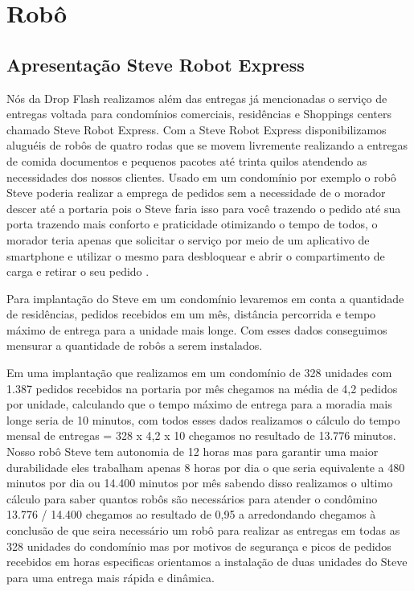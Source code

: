\chapter{Robô}
\label{ch:identificador}

\section{Apresentação Steve Robot Express}

Nós da Drop Flash realizamos além das entregas já mencionadas o serviço de entregas voltada para condomínios comerciais, residências e Shoppings centers chamado Steve Robot Express. Com a Steve Robot Express disponibilizamos aluguéis de robôs de quatro rodas que se movem livremente realizando a entregas    de comida documentos e pequenos pacotes até trinta quilos atendendo as necessidades dos nossos clientes. Usado em um condomínio por exemplo o robô Steve poderia realizar a emprega de pedidos sem a necessidade de o morador descer até a portaria pois o Steve faria isso para você trazendo o pedido até sua porta trazendo mais conforto e praticidade otimizando o tempo de todos, o morador teria apenas que solicitar o serviço por meio de um aplicativo de smartphone e utilizar o mesmo para desbloquear e abrir o compartimento de carga e retirar o seu pedido \cite{BoysenN2018}.

Para implantação do Steve em um condomínio levaremos em conta a quantidade de residências, pedidos recebidos em um mês, distância percorrida e tempo máximo de entrega para a unidade mais longe. Com esses dados conseguimos mensurar a quantidade de robôs a serem instalados.

Em uma implantação que realizamos em um condomínio de 328 unidades com 1.387 pedidos recebidos na portaria por mês chegamos na média de 4,2 pedidos por unidade, calculando que o tempo máximo de entrega para a moradia mais longe seria de 10 minutos, com todos esses dados realizamos o cálculo do tempo mensal de entregas = 328 x 4,2 x 10 chegamos no resultado de 13.776 minutos. Nosso robô Steve tem autonomia de 12 horas mas para garantir uma maior durabilidade eles trabalham apenas 8 horas por dia o que seria equivalente a 480 minutos por dia ou 14.400 minutos por mês sabendo disso realizamos o ultimo cálculo para saber quantos robôs são necessários para atender o condômino 13.776 / 14.400 chegamos ao resultado de 0,95 a arredondando chegamos à conclusão de que seira necessário um robô para realizar as entregas em todas as 328 unidades do condomínio mas por motivos de segurança e picos de pedidos recebidos em horas especificas orientamos a instalação de duas unidades do Steve para uma entrega mais rápida e dinâmica.

